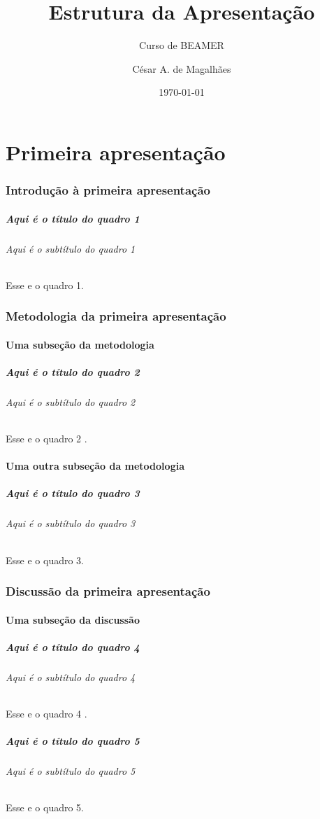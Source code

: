 \documentclass[aspectratio=169]{beamer}
\title{Estrutura da Apresentação}
\subtitle{Curso de BEAMER}
\author[César]{César A. de Magalhães}
\institute[UNOPAR]{Universidade do Norte do Paraná \\ https://vestibular.unoparead.com.br}
\date{\today}
\begin{document}
	\begin{frame}
		\titlepage
	\end{frame}
			
	\part{Primeira apresentação}
		\section[Introdução]{Introdução à primeira apresentação}
			\begin{frame}
				\frametitle{Aqui é o título do quadro 1}
				\framesubtitle{Aqui é o subtítulo do quadro 1}
				Esse e o quadro 1.
			\end{frame}	
		
		\section[Metodologia]{Metodologia da primeira apresentação}
			\subsection{Uma subseção da metodologia}
				\begin{frame}
					\frametitle{Aqui é o título do quadro 2}
					\framesubtitle{Aqui é o subtítulo do quadro 2}
					Esse e o quadro 2 \cite{meuartigo}.
				\end{frame}	
			
			\subsection{Uma outra subseção da metodologia}
				\begin{frame}
					\frametitle{Aqui é o título do quadro 3}
					\framesubtitle{Aqui é o subtítulo do quadro 3}
					Esse e o quadro 3.
				\end{frame}	
		
		\section[Discussão]{Discussão da primeira apresentação}
			\subsection{Uma subseção da discussão}
				\begin{frame}
					\frametitle{Aqui é o título do quadro 4}
					\framesubtitle{Aqui é o subtítulo do quadro 4}
					Esse e o quadro 4 \cite{meulivro}.
				\end{frame}
				\begin{frame}
					\frametitle{Aqui é o título do quadro 5}
					\framesubtitle{Aqui é o subtítulo do quadro 5}
					Esse e o quadro 5.
				\end{frame}
			
\end{document}
